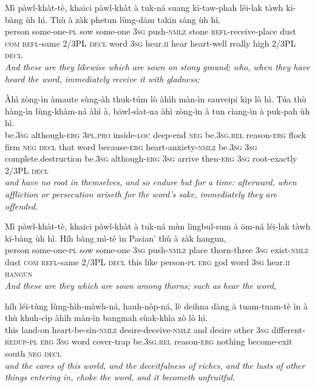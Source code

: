 \documentclass[11pt,a4paper]{article}
\begin{document}
\begin{exe}
\gll Mì pàwl-khàt-tè, khaici pàwl-khàt à tuk-ná suang kī-taw-phah léi-lak tàwh kī-bàng ùh hì. Thù à zàk phetun lùng-dām takin sàng ùh hì. \\
     person some-one-\textsc{pl} sow some-one \textsc{3sg} push-\textsc{nmlz} stone \textsc{refl}-receive-place dust \textsc{com} \textsc{refl}-same 2/3PL \textsc{decl} word \textsc{3sg} hear.\textsc{ii} hear heart-well really high 2/3PL \textsc{decl} \\
\glt \textcolor{kjvcolor}{\textit{And these are they likewise which are sown on stony ground; who, when they have heard the word, immediately receive it with gladness;}}

\gll Àhì zòng-ìn àmaute sùng-àh thuk-túm lò àhìh màn-ìn sauveipi kip lò hì. Túa thù hàng-ìn lùng-khàm-ná àhì à, bāwl-sìat-na àhì zòng-ìn à tun cìang-ìn à puk-pah ùh hì. \\
     be.\textsc{3sg} although-\textsc{erg} \textsc{3pl}.\textsc{pro} inside-\textsc{loc} deep-end \textsc{neg} be.\textsc{3sg}.\textsc{rel} reason-\textsc{erg} flock firm \textsc{neg} \textsc{decl} that word because-\textsc{erg} heart-anxiety-\textsc{nmlz} be.\textsc{3sg} \textsc{3sg} complete.destruction be.\textsc{3sg} although-\textsc{erg} \textsc{3sg} arrive then-\textsc{erg} \textsc{3sg} root-exactly 2/3PL \textsc{decl} \\
\glt \textcolor{kjvcolor}{\textit{and have no root in themselves, and so endure but for a time: afterward, when affliction or persecution ariseth for the word's sake, immediately they are offended.}}

\gll Mì pàwl-khàt-tè, khaici pàwl-khàt à tuk-ná mùn lingbul-sum à ōm-ná léi-lak tàwh kī-bàng ùh hì. Híh bàng mì-tè ìn Pasian' thù à zàk hangun, \\
     person some-one-\textsc{pl} sow some-one \textsc{3sg} push-\textsc{nmlz} place thorn-three \textsc{3sg} exist-\textsc{nmlz} dust \textsc{com} \textsc{refl}-same 2/3PL \textsc{decl} this like person-\textsc{pl} \textsc{erg} god word \textsc{3sg} hear.\textsc{ii} \textsc{hangun} \\
\glt \textcolor{kjvcolor}{\textit{And these are they which are sown among thorns; such as hear the word,}}

\gll híh léi-tùng lùng-hìh-màwh-ná, hauh-nòp-ná, lè deihna dàng à tuam-tuam-tè ìn à thù khuh-cìp àhìh màn-ìn bangmah sùak-khìa zò lò hì. \\
     this land-on heart-be-sin-\textsc{nmlz} desire-deceive-\textsc{nmlz} and desire other \textsc{3sg} different-\textsc{redup}-\textsc{pl} \textsc{erg} \textsc{3sg} word cover-trap be.\textsc{3sg}.\textsc{rel} reason-\textsc{erg} nothing become-exit south \textsc{neg} \textsc{decl} \\
\glt \textcolor{kjvcolor}{\textit{and the cares of this world, and the deceitfulness of riches, and the lusts of other things entering in, choke the word, and it becometh unfruitful.}}


\end{exe}
\end{document}
